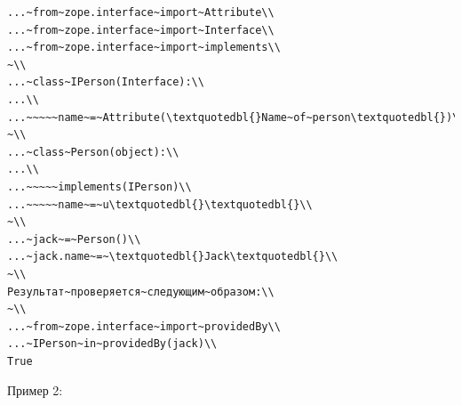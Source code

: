 \documentclass[a4paper,openany,twoside,draft]{book}
\begin{document}
\begin{verbatim}
...~from~zope.interface~import~Attribute\\
...~from~zope.interface~import~Interface\\
...~from~zope.interface~import~implements\\
~\\
...~class~IPerson(Interface):\\
...\\
...~~~~~name~=~Attribute(\textquotedbl{}Name~of~person\textquotedbl{})\\
~\\
...~class~Person(object):\\
...\\
...~~~~~implements(IPerson)\\
...~~~~~name~=~u\textquotedbl{}\textquotedbl{}\\
~\\
...~jack~=~Person()\\
...~jack.name~=~\textquotedbl{}Jack\textquotedbl{}\\
~\\
Результат~проверяется~следующим~образом:\\
~\\
...~from~zope.interface~import~providedBy\\
...~IPerson~in~providedBy(jack)\\
True
\end{verbatim}

Пример 2:
\end{document}
